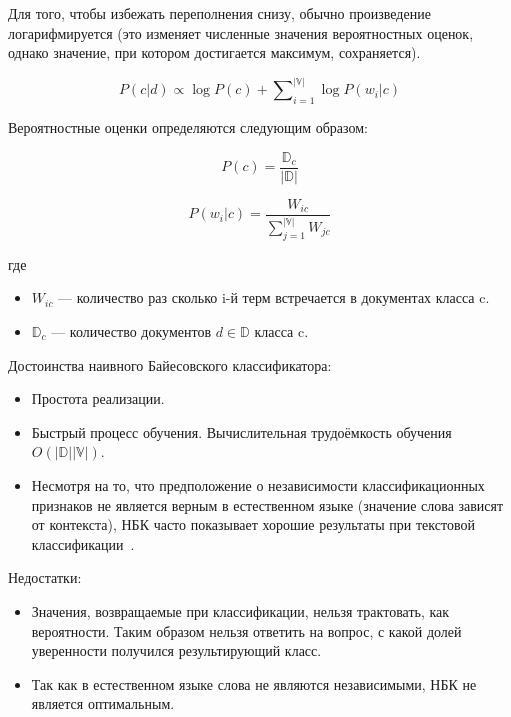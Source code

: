 Для того, чтобы избежать переполнения снизу, обычно произведение
логарифмируется (это изменяет численные значения вероятностных оценок, 
однако значение, при котором достигается максимум, сохраняется).

\begin{equation}
P(c | d) \propto \log P(c) + \sum\nolimits_{i=1}^{|\mathbb{V}|} \log P(w_i | c) 
\end{equation}

Вероятностные оценки определяются следующим образом:

\begin{equation}
P(c) = \frac{\mathbb{D}_c}{|\mathbb{D}|}
\end{equation}

\begin{equation}
P(w_i | c) = \frac{W_{ic}}{\sum\nolimits_{j=1}^{|\mathbb{V}|} W_{jc}}
\end{equation}

где 
\begin{itemize}

\item
$W_{ic}$ --- количество раз сколько i-й терм встречается в документах класса c.

\item
$\mathbb{D}_c$ --- количество документов $d \in \mathbb{D}$ класса c.

\end{itemize}

Достоинства наивного Байесовского классификатора:
\begin{itemize}

\item
Простота реализации.

\item
Быстрый процесс обучения. Вычислительная трудоёмкость обучения $O(|\mathbb{D}| |\mathbb{V}|)$.

\item
Несмотря на то, что предположение о независимости классификационных 
признаков не является верным в естественном языке (значение слова зависят от контекста), 
НБК часто показывает хорошие результаты при текстовой классификации~\cite{thumbs_up}. 

\end{itemize}

Недостатки:
\begin{itemize}

\item
Значения, возвращаемые при классификации, нельзя трактовать, 
как вероятности. Таким образом нельзя ответить на вопрос, 
с какой долей уверенности получился результирующий класс. 

\item
Так как в естественном языке слова не являются независимыми,
НБК не является оптимальным.

\end{itemize}

